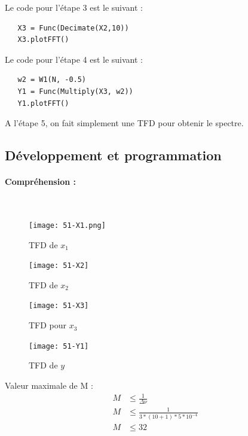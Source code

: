 \documentclass{article}
\begin{document}
Le code pour l'étape 3 est le suivant :
\begin{lstlisting}
   X3 = Func(Decimate(X2,10))
   X3.plotFFT()
\end{lstlisting}

Le code pour l'étape 4 est le suivant :
\begin{lstlisting}
   w2 = W1(N, -0.5)
   Y1 = Func(Multiply(X3, w2))
   Y1.plotFFT()
\end{lstlisting}

A l'étape 5, on fait simplement une TFD pour obtenir le spectre.

\subsection{Développement et programmation}

\paragraph{Compréhension :}

$\ $
\begin{figure}[h!]
    \begin{minipage}[c]{.46\linewidth}
        \centering
        \texttt{[image: 51-X1.png]}
        \caption{TFD de $x_{1}$}
    \end{minipage}
    \hfill%
    \begin{minipage}[c]{.46\linewidth}
        \centering
        \texttt{[image: 51-X2]}
        \caption{TFD de $x_{2}$}
    \end{minipage}
\end{figure}

\begin{figure}[h!]
    \begin{minipage}[c]{.46\linewidth}
        \centering
        \texttt{[image: 51-X3]}
        \caption{TFD pour $x_{3}$}
    \end{minipage}
    \hfill%
    \begin{minipage}[c]{.46\linewidth}
        \centering
        \texttt{[image: 51-Y1]}
        \caption{TFD de $y$}
    \end{minipage}
\end{figure}




Valeur maximale de M : 
\begin{align*}
M &\leq \frac{1}{\Delta\nu} \\
M &\leq \frac{1}{3*(10+1)*5*10^{-4}} \\
M &\leq 32
\end{align*}
\end{document}
